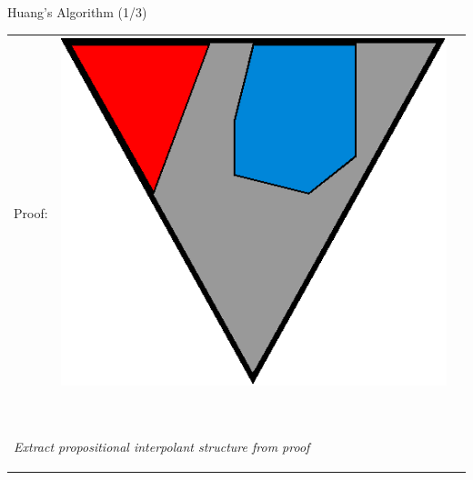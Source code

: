 \documentclass[final,compress]{beamer}
\begin{document}
\subsection{}
\begin{frame}{Huang's Algorithm (1/3)}
	\small
	
	\begin{tabular}{p{}ll}

		Proof: 
		&

		\multicolumn{1}{m{\fakemulticolwidth}}{
			\includegraphics[width=\proofwidth]{figures/two_phase_draft_proof}
		}
		&
		\vspace*{0.2em}
		\\

		\multicolumn{2}{l}{
			\proofindent{\stagearrow} ~\parbox[c]{14em}{\raggedright \emph{ Extract propositional interpolant structure from proof}}
			\vspace*{0.2em}
		}
		\\


\end{tabular}
\end{frame}
\end{document}
